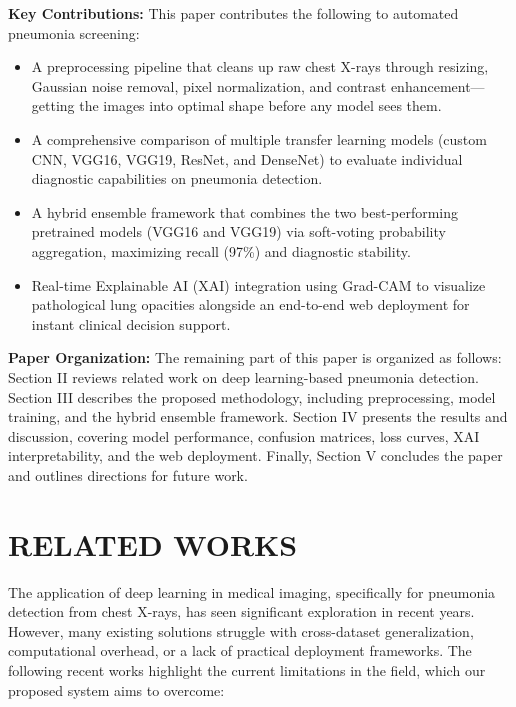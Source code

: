 \documentclass[conference]{IEEEtran}
\begin{document}
\textbf{Key Contributions:}
This paper contributes the following to automated pneumonia screening:
\begin{itemize}
    \item A preprocessing pipeline that cleans up raw chest X-rays through resizing, Gaussian noise removal, pixel normalization, and contrast enhancement—getting the images into optimal shape before any model sees them.
    \item A comprehensive comparison of multiple transfer learning models (custom CNN, VGG16, VGG19, ResNet, and DenseNet) to evaluate individual diagnostic capabilities on pneumonia detection.
    \item A hybrid ensemble framework that combines the two best-performing pretrained models (VGG16 and VGG19) via soft-voting probability aggregation, maximizing recall (97\%) and diagnostic stability.
    \item Real-time Explainable AI (XAI) integration using Grad-CAM to visualize pathological lung opacities alongside an end-to-end web deployment for instant clinical decision support.
\end{itemize}

\textbf{Paper Organization:}
The remaining part of this paper is organized as follows: Section II reviews related work on deep learning-based pneumonia detection. Section III describes the proposed methodology, including preprocessing, model training, and the hybrid ensemble framework. Section IV presents the results and discussion, covering model performance, confusion matrices, loss curves, XAI interpretability, and the web deployment. Finally, Section V concludes the paper and outlines directions for future work.

\section{RELATED WORKS}
\label{sec:related}
The application of deep learning in medical imaging, specifically for pneumonia detection from chest X-rays, has seen significant exploration in recent years. However, many existing solutions struggle with cross-dataset generalization, computational overhead, or a lack of practical deployment frameworks. The following recent works highlight the current limitations in the field, which our proposed system aims to overcome:
\end{document}
